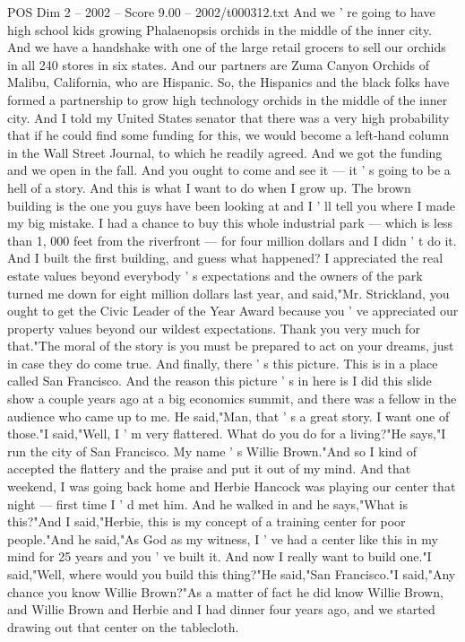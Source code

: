 \begin{textsample}{POS Dim 2 – 2002 – Score 9.00 – 2002/t000312.txt}
And we ' re going to have high school kids growing Phalaenopsis orchids in the middle of the inner city.
And we have a handshake with one of the large retail grocers to sell our orchids in all 240 stores in six states.
And our partners are Zuma Canyon Orchids of Malibu, California, who are Hispanic.
So, the Hispanics and the black folks have formed a partnership to grow high technology orchids in the middle of the inner city.
And I told my United States senator that there was a very high probability that if he could find some funding for this, we would become a left-hand column in the Wall Street Journal, to which he readily agreed.
And we got the funding and we open in the fall.
And you ought to come and see it — it ' s going to be a hell of a story.
And this is what I want to do when I grow up.
The brown building is the one you guys have been looking at and I ' ll tell you where I made my big mistake.
I had a chance to buy this whole industrial park — which is less than 1, 000 feet from the riverfront — for four million dollars and I didn ' t do it.
And I built the first building, and guess what happened?
I appreciated the real estate values beyond everybody ' s expectations and the owners of the park turned me down for eight million dollars last year, and said,"Mr.
Strickland, you ought to get the Civic Leader of the Year Award because you ' ve appreciated our property values beyond our wildest expectations.
Thank you very much for that."The moral of the story is you must be prepared to act on your dreams, just in case they do come true.
And finally, there ' s this picture.
This is in a place called San Francisco.
And the reason this picture ' s in here is I did this slide show a couple years ago at a big economics summit, and there was a fellow in the audience who came up to me.
He said,"Man, that ' s a great story.
I want one of those."I said,"Well, I ' m very flattered.
What do you do for a living?"He says,"I run the city of San Francisco.
My name ' s Willie Brown."And so I kind of accepted the flattery and the praise and put it out of my mind.
And that weekend, I was going back home and Herbie Hancock was playing our center that night — first time I ' d met him.
And he walked in and he says,"What is this?"And I said,"Herbie, this is my concept of a training center for poor people."And he said,"As God as my witness, I ' ve had a center like this in my mind for 25 years and you ' ve built it.
And now I really want to build one."I said,"Well, where would you build this thing?"He said,"San Francisco."I said,"Any chance you know Willie Brown?"As a matter of fact he did know Willie Brown, and Willie Brown and Herbie and I had dinner four years ago, and we started drawing out that center on the tablecloth.

\end{textsample}
